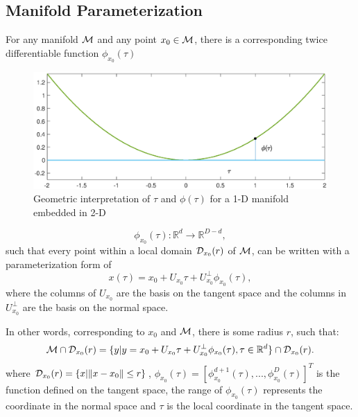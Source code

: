 \documentclass[aos,preprint]{imsart}
\theoremstyle{remark}
\begin{document}
\subsection{Manifold Parameterization}
For any manifold $\cal M$ and any point $x_0\in \cal M$, there is a corresponding twice differentiable function $\phi_{x_0}(\tau)$ 
\begin{figure}[h!] %
   \centering
   \includegraphics[width=5in]{demo_phi.eps} 
   \caption{Geometric interpretation of $\tau$ and $\phi(\tau)$ for a  1-D manifold embedded in 2-D}
   \label{3-D paraboloid}
\end{figure}
\[
\phi_{x_0}(\tau):{\mathbb R}^d\rightarrow {\mathbb R}^{D-d},
\]
such that every point within a local domain ${\cal D}_{x_0}(r)$ of $\cal M$, can be written with a parameterization form of 
\begin{equation}\label{manifold}
x(\tau)=  x_0 + U_{x_0} \tau+ U_{x_0}^{\perp} \phi_{x_0} (\tau),
\end{equation}
where the columns of $U_{x_0}$ are the basis on the tangent space and the columns in $U_{x_0}^{\perp}$ are the basis on the normal space. 


In other words, corresponding to $x_0$ and $\cal M$, there is some radius $r$, such that:
\begin{equation}\label{model}
 {\cal M}\cap {\cal D}_{x_0}(r) =  \{y | y =  x_0 + U_{x_0} \tau+ U_{x_0}^{\perp} \phi_{x_0} (\tau), \tau\in {\mathbb R}^d\}\cap {\cal D}_{x_0}(r).
\end{equation}
where ${\cal D}_{x_0}(r) = \{x|\|x-x_0\|\leq r\}$, $\phi_{x_0}(\tau)=[\phi_{x_0}^{d+1}(\tau),...,\phi_{x_0}^{D}(\tau)]^T$  is the function defined on the tangent space, the range of $\phi_{x_0}(\tau)$ represents the coordinate in the normal space and $\tau$ is the local coordinate in the tangent space.
\end{document}
